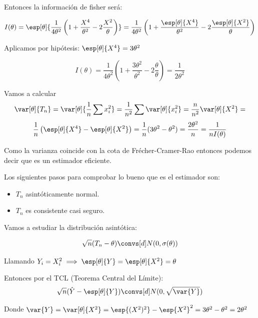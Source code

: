 \begin{problem}[2]
Entonces la información de fisher será:

\[I(\theta) = \esp[\theta]{\frac{1}{4\theta^2} \left( 1+\frac{X^4}{\theta^2} - 2\frac{X^2}{\theta}\right)} = \frac{1}{4\theta^2} \left( 1+\frac{\esp[\theta]{X^4}}{\theta^2} - 2\frac{\esp[\theta]{X^2}}{\theta}\right)\]

Aplicamos por hipótesis: $\esp[\theta]{X^4} = 3\theta^2$

\[I(\theta) = \frac{1}{4\theta^2} \left(1+\frac{3\theta^2}{\theta^2} - 2 \frac{\theta}{\theta}\right) = \frac{1}{2\theta^2}\]

Vamos a calcular \[\var[\theta]{T_n} = \var[\theta]{\frac{1}{n}\sum x_i^2} = \frac{1}{n^2}\sum \var[\theta]{x_i^2} = \frac{n}{n^2} \var[\theta]{X^2} =\]
\[ \frac{1}{n}\left(\esp[\theta]{X^4} - \esp[\theta]{X^2}\right) = \frac{1}{n}(3\theta^2-\theta^2) = \frac{2\theta^2}{n} = \frac{1}{nI(\theta)}\]

Como la varianza coincide con la cota de Frécher-Cramer-Rao entonces podemos decir que es un estimador eficiente.

Los siguientes pasos para comprobar lo bueno que es el estimador son: \begin{itemize}
\item $T_n$ asintóticamente normal.
\item $T_n$ es consistente casi seguro.
\end{itemize}

\spart Vamos a estudiar la distribución asintótica:

\[\sqrt{n}(T_n-\theta) \convs[d] N(0,\sigma(\theta))\]

Llamando $Y_i = X_i^2 \implies \esp[\theta]{Y} = \esp[\theta]{X^2} = \theta$

Entonces por el TCL (Teorema Central del Límite): \[\displaystyle \sqrt{n}(\hat{Y} - \esp[\theta]{Y}) \convs[d] N(0,\sqrt{\var{Y}})\]

Donde $\var{Y} = \var[\theta]{X^2} = \esp{(X^2)^2} - \esp{X^2}^2 = 3\theta^2 - \theta^2 = 2\theta^2$
\end{problem}



